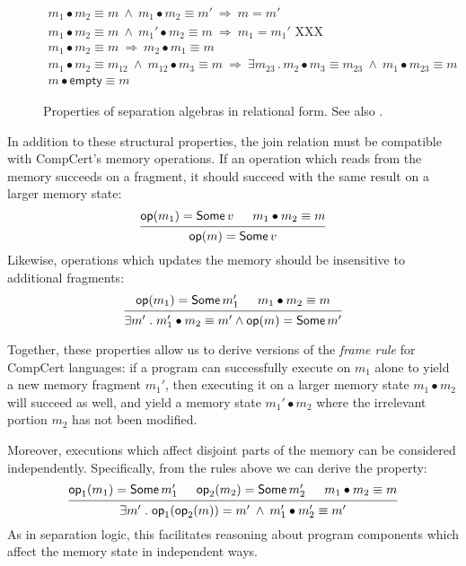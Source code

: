 \documentclass[acmsmall,screen,review,anonymous]{acmart}
\newcommand{\kw}[1]{\ensuremath{ \mathsf{#1} }}
\begin{document}
\begin{figure}
  \begin{gather*}
    m_1 \bullet m_2 \equiv m \:\wedge\:
      m_1 \bullet m_2 \equiv m' \:\Rightarrow\:
      m = m'
      \\
    m_1 \bullet m_2 \equiv m \:\wedge\:
      m_1' \bullet m_2 \equiv m \:\Rightarrow\:
      m_1 = m_1'
      \text{ XXX}
      \\
    m_1 \bullet m_2 \equiv m \:\Rightarrow\:
      m_2 \bullet m_1 \equiv m
      \\
    m_1 \bullet m_2 \equiv m_{12} \:\wedge\:
      m_{12} \bullet m_3 \equiv m \:\Rightarrow\:
      \exists m_{23} \mathrel.
      m_2 \bullet m_3 \equiv m_{23} \:\wedge\:
      m_1 \bullet m_{23} \equiv m
      \\
    m \bullet \kw{empty} \equiv m
  \end{gather*}
  \caption{Properties of separation algebras
    in relational form. See also \citet{freshlook}.}
  \label{fig:sepalg}
\end{figure}

In addition to these structural properties,
the join relation must be compatible
with CompCert's memory operations.
If an operation which reads from the memory succeeds on a fragment,
it should succeed with the same result on a larger memory state:
\[
  \begin{prooftree}
    \hypo{\kw{op}(m_1) = \kw{Some}\,v}
    \hypo{m_1 \bullet m_2 \equiv m}
    \infer2{\kw{op}(m) = \kw{Some}\,v}
  \end{prooftree}
\]
Likewise,
operations which updates the memory
should be insensitive to additional fragments:
\[
  \begin{prooftree}
    \hypo{\kw{op}(m_1) = \kw{Some}\,m_1'}
    \hypo{m_1 \bullet m_2 \equiv m}
    \infer2{\exists m' \mathrel.
      m_1' \bullet m_2 \equiv m' \wedge
      \kw{op}(m) = \kw{Some}\,m'}
  \end{prooftree}
\]

Together,
these properties allow us to derive
versions of the \emph{frame rule}
for CompCert languages:
if a program can successfully execute on $m_1$ alone
to yield a new memory fragment $m_1'$,
then executing it on a larger memory state
$m_1 \bullet m_2$ will succeed as well,
and yield a memory state $m_1' \bullet m_2$
where the irrelevant portion $m_2$
has not been modified.

Moreover,
executions which affect disjoint parts of the memory
can be considered independently.
Specifically, from the rules above
we can derive the property:
\[
  \begin{prooftree}
    \hypo{\kw{op}_1(m_1) = \kw{Some}\,m_1'}
    \hypo{\kw{op}_2(m_2) = \kw{Some}\,m_2'}
    \hypo{m_1 \bullet m_2 \equiv m}
    \infer3{\exists m' \mathrel.
      \kw{op}_1(\kw{op}_2(m)) =
	m' \:\wedge\:
      m_1' \bullet m_2' \equiv m'}
  \end{prooftree}
\]
As in separation logic,
this facilitates reasoning
about program components
which affect the memory state in independent ways.
\end{document}
